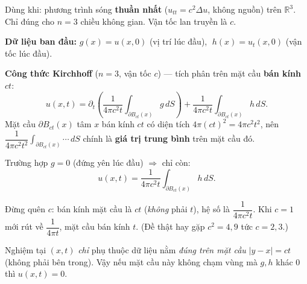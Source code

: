 \begin{dieukienbox}
Dùng khi: phương trình sóng \textbf{thuần nhất} ($u_{tt}=c^2\Delta u$, không nguồn) trên $\mathbb{R}^3$.
Chỉ đúng cho $n=3$ chiều không gian. Vận tốc lan truyền là $c$.
\end{dieukienbox}

\begin{nhobox}
\textbf{Dữ liệu ban đầu:} $g(x)=u(x,0)$ (vị trí lúc đầu), $\;h(x)=u_t(x,0)$ (vận tốc lúc đầu).

\textbf{Công thức Kirchhoff} ($n=3$, vận tốc $c$) --- tích phân trên mặt cầu \textbf{bán kính $ct$}:
\[
  u(x,t)=\partial_t\!\left(\frac{1}{4\pi c^2 t}\int_{\partial B_{ct}(x)} g\,dS\right)
  +\frac{1}{4\pi c^2 t}\int_{\partial B_{ct}(x)} h\,dS .
\]
Mặt cầu $\partial B_{ct}(x)$ tâm $x$ bán kính $ct$ có diện tích $4\pi(ct)^2=4\pi c^2t^2$, nên
$\dfrac{1}{4\pi c^2t^2}\int_{\partial B_{ct}(x)}\!\cdots\,dS$ chính là \textbf{giá trị trung bình} trên mặt cầu đó.

Trường hợp $g=0$ (đứng yên lúc đầu) $\Rightarrow$ chỉ còn:
\[
  u(x,t)=\frac{1}{4\pi c^2 t}\int_{\partial B_{ct}(x)} h\,dS .
\]
\end{nhobox}

\begin{luuybox}
Đừng quên $c$: bán kính mặt cầu là $ct$ (\emph{không} phải $t$), hệ số là $\dfrac{1}{4\pi c^2t}$. Khi $c=1$ mới rút về $\dfrac{1}{4\pi t}$, mặt cầu bán kính $t$. (Đề thật hay gặp $c^2=4,9$ tức $c=2,3$.)
\end{luuybox}

\begin{meobox}
Nghiệm tại $(x,t)$ \emph{chỉ} phụ thuộc dữ liệu nằm \emph{đúng trên mặt cầu} $|y-x|=ct$ (không phải bên trong).
Vậy nếu mặt cầu này không chạm vùng mà $g,h$ khác $0$ thì $u(x,t)=0$.
\end{meobox}
